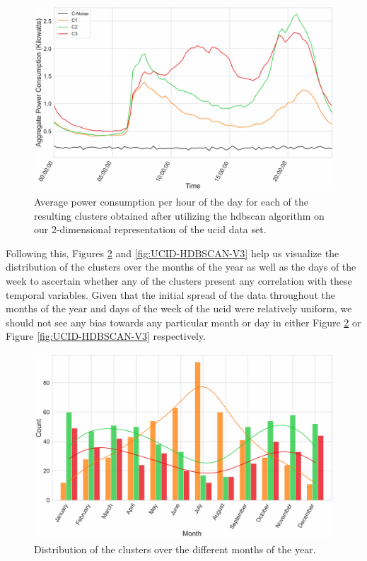 \begin{adjustwidth}{-1.65cm}{-0.0cm}
\begin{enumerate}[label=Step 2.\arabic*:, leftmargin=*]
        \begin{figure}[hbt!]
            \centering
            \includegraphics[width=\textwidth]{Images/Chapter 6/UCID/UCID-HDBSCAN-V1.pdf}
            \caption{Average power consumption per hour of the day for each of the resulting clusters obtained after utilizing the \gls{hdbscan} algorithm on our 2-dimensional representation of the \gls{ucid} data set.}
            \label{fig:UCID-HDBSCAN-V1}
        \end{figure}
        
        \noindent \newline Following this, Figures \ref{fig:UCID-HDBSCAN-V2} and \ref{fig:UCID-HDBSCAN-V3} help us visualize the distribution of the clusters over the months of the year as well as the days of the week to ascertain whether any of the clusters present any correlation with these temporal variables. Given that the initial spread of the data throughout the months of the year and days of the week of the \gls{ucid} were relatively uniform, we should not see any bias towards any particular month or day in either Figure \ref{fig:UCID-HDBSCAN-V2} or Figure \ref{fig:UCID-HDBSCAN-V3} respectively.
        
        \begin{figure}[H]
            \centering
            \includegraphics[width=\textwidth]{Images/Chapter 6/UCID/UCID-HDBSCAN-V2.1.pdf}
            \caption{Distribution of the clusters over the different months of the year.}
            \label{fig:UCID-HDBSCAN-V2}
        \end{figure}
        

\end{enumerate}
\end{adjustwidth}
